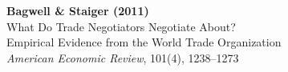 \documentclass[12pt]{article}
\begin{document}
\begin{center}
{\Large\bfseries Bagwell \& Staiger (2011)}\\
{\large What Do Trade Negotiators Negotiate About?}\\
{\large Empirical Evidence from the World Trade Organization}\\
\vspace{0.5em}
{\normalsize \textit{American Economic Review}, 101(4), 1238--1273}
\end{center}

\vspace{1em}


\end{document}
